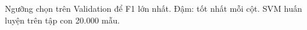 Ngưỡng chọn trên Validation để F1 lớn nhất. Đậm: tốt nhất mỗi cột. SVM huấn luyện trên tập con 20.000 mẫu.
